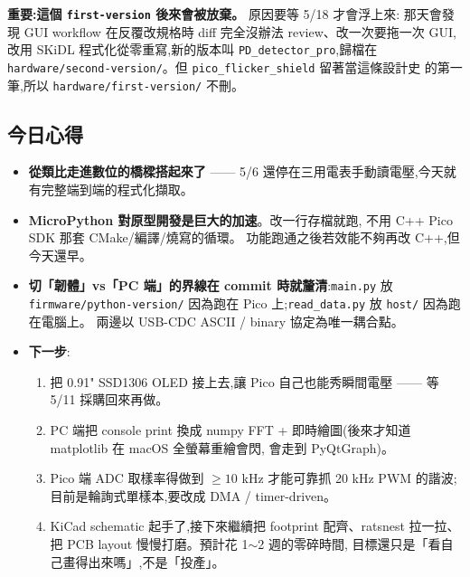 \textbf{重要:這個 \texttt{first-version} 後來會被放棄。} 原因要等 5/18 才會浮上來:
那天會發現 GUI workflow 在反覆改規格時 diff 完全沒辦法 review、改一次要拖一次 GUI,
改用 SKiDL 程式化從零重寫,新的版本叫 \texttt{PD\_detector\_pro},歸檔在
\texttt{hardware/second-version/}。但 \texttt{pico\_flicker\_shield} 留著當這條設計史
的第一筆,所以 \texttt{hardware/first-version/} 不刪。

\subsection*{今日心得}

\begin{itemize}[leftmargin=2em,itemsep=0pt]
  \item \textbf{從類比走進數位的橋樑搭起來了} —— 5/6 還停在三用電表手動讀電壓,今天就有完整端到端的程式化擷取。
  \item \textbf{MicroPython 對原型開發是巨大的加速}。改一行存檔就跑,
        不用 C++ Pico SDK 那套 CMake/編譯/燒寫的循環。
        功能跑通之後若效能不夠再改 C++,但今天還早。
  \item \textbf{切「韌體」vs「PC 端」的界線在 commit 時就釐清}:\texttt{main.py} 放
        \texttt{firmware/python-version/} 因為跑在 Pico 上;\texttt{read\_data.py} 放 \texttt{host/} 因為跑在電腦上。
        兩邊以 USB-CDC ASCII / binary 協定為唯一耦合點。
  \item \textbf{下一步}:
        \begin{enumerate}[leftmargin=2em,itemsep=0pt]
          \item 把 0.91" SSD1306 OLED 接上去,讓 Pico 自己也能秀瞬間電壓 —— 等 5/11 採購回來再做。
          \item PC 端把 console print 換成 numpy FFT + 即時繪圖(後來才知道 matplotlib 在 macOS 全螢幕重繪會閃,
                會走到 PyQtGraph)。
          \item Pico 端 ADC 取樣率得做到 \(\geq 10\) kHz 才能可靠抓 20 kHz PWM 的諧波;
                目前是輪詢式單樣本,要改成 DMA / timer-driven。
          \item KiCad schematic 起手了,接下來繼續把 footprint 配齊、ratsnest 拉一拉、
                把 PCB layout 慢慢打磨。預計花 1\(\sim\)2 週的零碎時間,
                目標還只是「看自己畫得出來嗎」,不是「投產」。
        \end{enumerate}
\end{itemize}
